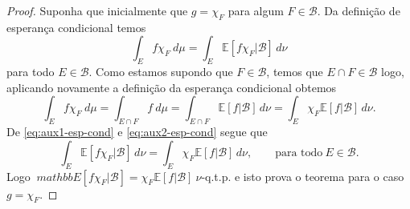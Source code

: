 \begin{proof}

Suponha que inicialmente que $g=\chi_{F}$ 
para algum $F\in\mathcal{B}$. 
Da definição de esperança condicional temos  
\begin{equation}\label{eq:aux1-esp-cond}
\int_{E} f\chi_{F}\ d\mu
=
\int_{E}\mathbb{E}[f\chi_{F}|\mathcal{B}]\, d\nu
\end{equation}
para todo $E\in\mathcal{B}$. 
Como estamos supondo que $F\in\mathcal{B}$, 
temos que $E\cap F\in\mathcal{B}$ 
logo, aplicando novamente a definição da 
esperança condicional obtemos  
%
%
\begin{equation}
\label{eq:aux2-esp-cond}
\int_{E} f\chi_{F}\ d\mu=\int_{E\cap F} f\ d\mu
=
\int_{E\cap F}\mathbb{E}[f|\mathcal{B}]\, d\nu
=
\int_{E}\chi_{F}\mathbb{E}[f|\mathcal{B}]\, d\nu.
\end{equation}
De \eqref{eq:aux1-esp-cond} e \eqref{eq:aux2-esp-cond} 
segue que 
\[
\int_{E}\mathbb{E}[f\chi_{F}|\mathcal{B}]\, d\nu
=
\int_{E}\chi_{F}\mathbb{E}[f|\mathcal{B}]\, d\nu,
\qquad \text{para todo}\ E\in\mathcal{B}.
\]
Logo 
$\
mathbb{E}[f\chi_{F}|\mathcal{B}]
=\chi_{F}\mathbb{E}[f|\mathcal{B}]
\ \nu$-q.t.p. e isto prova o teorema 
para o caso $g=\chi_{F}$. 


\end{proof}

